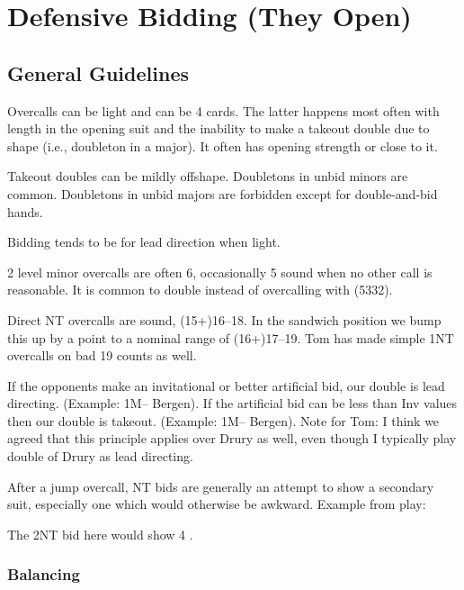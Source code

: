 \documentclass[tom-ari]{subfile}
\begin{document}
	
	\chapter{Defensive Bidding (They Open)}
	
	\section{General Guidelines}
	
	Overcalls can be light and can be 4 cards. The latter happens most often with length in the opening suit and the inability to make a takeout double due to shape (i.e., doubleton in a major). It often has opening strength or close to it.
	
	Takeout doubles can be mildly offshape. Doubletons in unbid minors are common. Doubletons in unbid majors are forbidden except for double-and-bid hands.
	
	Bidding tends to be for lead direction when light.
	
	2 level minor overcalls are often 6, occasionally 5 sound when no other call is reasonable. It is common to double instead of overcalling with \shape(5332).
	
	Direct NT overcalls are sound, (15+)16--18. In the sandwich position we bump this up by a point to a nominal range of (16+)17--19. Tom has made simple 1NT overcalls on bad 19 counts as well.
	
	If the opponents make an invitational or better artificial bid, our double is lead directing. (Example: 1M-- Bergen).  If the artificial bid can be less than Inv values then our double is takeout.  (Example: 1M-- Bergen). Note for Tom: I think we agreed that this principle applies over Drury as well, even though I typically play double of Drury as lead directing. 
	
	After a jump overcall, NT bids are generally an attempt to show a secondary suit, especially one which would otherwise be awkward.  Example from play:  
	
	
	The 2NT bid here would show 4 . 
	
	\subsection{Balancing}
	
\end{document}
